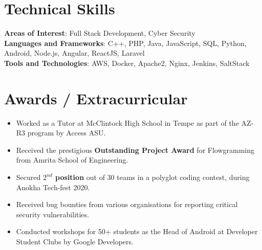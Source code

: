 \documentclass[letterpaper,11pt]{article}
\newcommand{\resumeItem}[1]{
  \item\small{
    {#1 \vspace{-2pt}}
  }
}
\newcommand{\resumeItemListStart}{\begin{itemize}}
\newcommand{\resumeItemListEnd}{\end{itemize}\vspace{-5pt}}
\begin{document}
%
\section{Technical Skills}
 \begin{itemize}[leftmargin=0.15in, label={}]
    \small{\item{
    \textbf{Areas of Interest}{: Full Stack Development, Cyber Security} \\
     \textbf{Languages and Frameworks}{: C++, PHP, Java, JavaScript, SQL, Python, Android, Node.js, Angular, ReactJS, Laravel} \\
     \textbf{Tools and Technologies}{: AWS, Docker, Apache2, Nginx, Jenkins, SaltStack} \\
    }}
 \end{itemize}
 \vspace{-16pt}


\section{Awards / Extracurricular}
            \resumeItemListStart
                        	\resumeItem{Worked as a Tutor at McClintock High School in Tempe as part of the AZ-R3 program by Access ASU.}\vspace{-5pt}
            	\resumeItem{Received the prestigious \textbf{Outstanding Project Award} for Flowgramming from Amrita School of Engineering.}\vspace{-5pt}
                \resumeItem{Secured \textbf{{$2^{nd}$} position} out of 30 teams in a polyglot coding contest, during Anokha Tech-fest 2020.}\vspace{-5pt}
                \resumeItem{Received bug bounties from various organisations for reporting critical security vulnerabilities.}\vspace{-5pt}
                \resumeItem{Conducted workshops for 50+ students as the Head of Android at Developer Student Clubs by Google Developers.}\vspace{-5pt}
            \resumeItemListEnd
\end{document}
